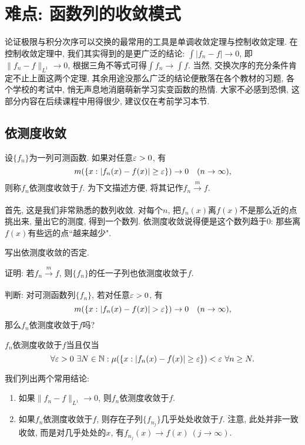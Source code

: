 \section{难点: 函数列的收敛模式}
论证极限与积分次序可以交换的最常用的工具是单调收敛定理与控制收敛定理. 在控制收敛定理中, 我们其实得到的是更广泛的结论: $\int |f_n - f| \to 0$, 即$\|f_n - f\|_{L^1} \to 0$, 根据三角不等式可得$\int f_n \to \int f$. 当然, 交换次序的充分条件肯定不止上面这两个定理, 其余用途没那么广泛的结论便散落在各个教材的习题, 各个学校的考试中, 悄无声息地消磨萌新学习实变函数的热情. 大家不必感到恐惧, 这部分内容在后续课程中用得很少, 建议仅在考前学习本节. 
\subsection{依测度收敛}
\begin{definition}
    设$\{f_n\}$为一列可测函数. 如果对任意$\varepsilon > 0$, 有
    $$m(\{x: |f_n(x) - f(x)| \geq \varepsilon\}) \to 0 \quad (n \to \infty),$$
    则称$f_n$依测度收敛于$f$. 为下文描述方便, 将其记作$f_n \xrightarrow[]{m} f$. 
\end{definition}
首先, 这是我们非常熟悉的数列收敛. 对每个$n$, 把$f_n(x)$离$f(x)$不是那么近的点挑出来, 量出它的测度, 得到一个数列. 依测度收敛说得便是这个数列趋于0:
那些离$f(x)$有些远的点``越来越少".
\begin{exercise}
    写出依测度收敛的否定.
\end{exercise}
\begin{exercise}
    证明: 若$f_n \xrightarrow[]{m} f$, 则$\{f_n\}$的任一子列也依测度收敛于$f$. 
\end{exercise}
\begin{exercise}
    判断: 对可测函数列$\{f_n\}$, 若对任意$\varepsilon>0$, 有
    $$m(\{x: |f_n(x) - f(x)| > \varepsilon\}) \to 0 \quad (n \to \infty),$$
    那么$f_n$依测度收敛于$f$吗?
\end{exercise}
\begin{exercise}
    $f_n$依测度收敛于$f$当且仅当
    $$\forall \varepsilon > 0 ~\exists N \in \mathbb{N}: 
    \mu(\{x:|f_n(x)-f(x)| \geq \varepsilon\}) < \varepsilon ~\forall n \geq N.$$
\end{exercise}
我们列出两个常用结论:
\begin{proposition}
    \begin{enumerate}
    \item 如果$\|f_n - f\|_{L^1} \to 0$, 则$f_n$依测度收敛于$f$. 
    \item 如果$f_n$依测度收敛于$f$, 则存在子列$\{f_{n_j}\}$几乎处处收敛于$f$. 注意, 此处并非一致收敛, 而是对几乎处处的$x$, 有$f_{n_j}(x) \to f(x)~(j \to \infty)$.
\end{enumerate}
\end{proposition}
